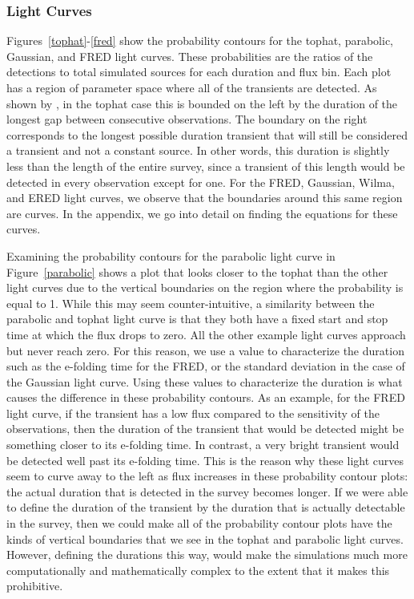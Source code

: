 \documentclass[12pt]{article}
\begin{document}
\subsubsection{Light Curves}\label{lcdiscussion}
Figures~\ref{tophat}-\ref{fred} show the probability contours for the tophat, parabolic, Gaussian, and FRED light curves. These probabilities are the ratios of the detections to total simulated sources for each duration and flux bin. Each plot has a region of parameter space where all of the transients are detected. As shown by \citet{2017MNRAS.465.4106C}, in the tophat case this is bounded on the left by the duration of the longest gap between consecutive observations. The boundary on the right corresponds to the longest possible duration transient that will still be considered a transient and not a constant source. In other words, this duration is slightly less than the length of the entire survey, since a transient of this length would be detected in every observation except for one.  For the FRED, Gaussian, Wilma, and ERED light curves, we observe that the boundaries around this same region are curves. In the appendix, we go into detail on finding the equations for these curves. 

Examining the probability contours for the parabolic light curve in Figure~\ref{parabolic} shows a plot that looks closer to the tophat than the other light curves due to the vertical boundaries on the region where the probability is equal to 1. While this may seem counter-intuitive, a similarity between the parabolic and tophat light curve is that they both have a fixed start and stop time at which the flux drops to zero. All the other example light curves approach but never reach zero. For this reason, we use a value to characterize the duration such as the e-folding time for the FRED, or the standard deviation in the case of the Gaussian light curve. Using these values to characterize the duration is what causes the difference in these probability contours. As an example, for the FRED light curve, if the transient has a low flux compared to the sensitivity of the observations, then the duration of the transient that would be detected might be something closer to its e-folding time. In contrast, a very bright transient would be detected well past its e-folding time. This is the reason why these light curves seem to curve away to the left as flux increases in these probability contour plots: the actual duration that is detected in the survey becomes longer. If we were able to define the duration of the transient by the duration that is actually detectable in the survey, then we could make all of the probability contour plots have the kinds of vertical boundaries that we see in the tophat and parabolic light curves. However, defining the durations this way, would make the simulations much more computationally and mathematically complex to the extent that it makes this prohibitive. 
\end{document}

